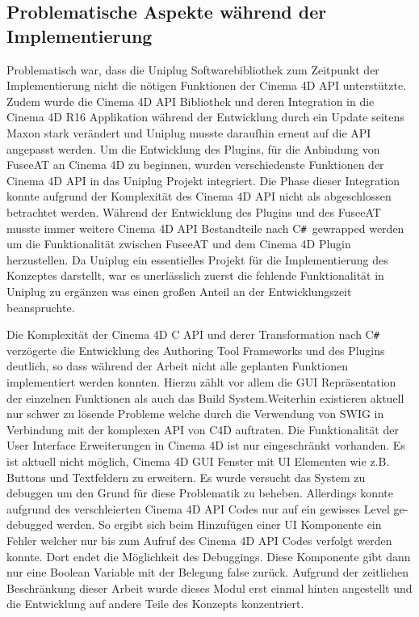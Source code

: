 \documentclass[pagesize, paper=a4, fontsize=12pt, titlepage=true, headings=small, headnosepline, abstractoff, liststotoc, nochapterprefix, plainheadsepline, twoside]{scrreprt}
\newcommand{\CSS}{C\texttt{\# }}
\newcommand{\CPPS}{C\nolinebreak\hspace{-.05em}\raisebox{.4ex}{\tiny\bf +}\nolinebreak\hspace{-.10em}\raisebox{.4ex}{\tiny\bf +} }
\begin{document}
\subsection{Problematische Aspekte während der Implementierung}
Problematisch war, dass die Uniplug Softwarebibliothek zum Zeitpunkt der Implementierung nicht die nötigen Funktionen der Cinema 4D API unterstützte. Zudem wurde die Cinema 4D API Bibliothek und deren Integration in die Cinema 4D R16 Applikation während der Entwicklung durch ein Update seitens Maxon stark verändert und Uniplug musste daraufhin erneut auf die API angepasst werden. Um die Entwicklung des Plugins, für die Anbindung von FuseeAT an Cinema 4D zu beginnen, wurden verschiedenste  Funktionen der Cinema 4D API in das Uniplug Projekt integriert. Die Phase dieser Integration konnte aufgrund der Komplexität des Cinema 4D API nicht als abgeschlossen betrachtet werden. Während der Entwicklung des Plugins und des FuseeAT musste immer weitere Cinema 4D API Bestandteile nach \CSS gewrapped werden um die Funktionalität zwischen FuseeAT und dem Cinema 4D Plugin herzustellen. Da Uniplug ein essentielles Projekt für die Implementierung des Konzeptes darstellt, war es unerlässlich zuerst die fehlende Funktionalität in Uniplug zu ergänzen was einen großen Anteil an der Entwicklungszeit beanspruchte.

Die Komplexität der Cinema 4D \CPPS API und derer Transformation nach \CSS verzögerte die Entwicklung des Authoring Tool Frameworks und des Plugins deutlich, so dass während der Arbeit nicht alle geplanten Funktionen implementiert werden konnten. Hierzu zählt vor allem die GUI Repräsentation der einzelnen Funktionen als auch das Build System.Weiterhin existieren aktuell nur schwer zu lösende Probleme welche durch die Verwendung von SWIG in Verbindung mit der komplexen API von C4D auftraten. Die Funktionalität der User Interface Erweiterungen in Cinema 4D ist nur eingeschränkt vorhanden. Es ist aktuell nicht möglich, Cinema 4D GUI Fenster mit UI Elementen wie z.B. Buttons und Textfeldern zu erweitern. Es wurde versucht das System zu debuggen um den Grund für diese Problematik zu beheben. Allerdings konnte aufgrund des verschleierten Cinema 4D API Codes nur auf ein gewisses Level ge-debugged werden. So ergibt sich beim Hinzufügen einer UI Komponente ein Fehler welcher nur bis zum Aufruf des Cinema 4D API Codes verfolgt werden konnte. Dort endet die Möglichkeit des Debuggings. Diese Komponente gibt dann nur eine Boolean Variable mit der Belegung false zurück. Aufgrund der zeitlichen Beschränkung dieser Arbeit wurde dieses Modul erst einmal hinten angestellt und die Entwicklung auf andere Teile des Konzepts konzentriert.
\end{document}
